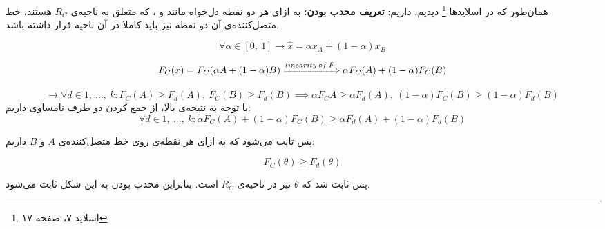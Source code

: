 
همان‌طور که در اسلاید‌ها
\footnote{اسلاید ۷، صفحه ۱۷}
دیدیم، داریم:
\newline
\newline
\textbf{تعریف محدب بودن:}
به ازای هر دو نقطه دل‌خواه مانند  و ، که متعلق به ناحیه‌ی $R_C$ هستند، خط متصل‌کننده‌ی آن دو نقطه نیز باید کاملا در آن ناحیه قرار داشته باشد.



$$
\forall \alpha \in [0, \: 1] \rightarrow
\hat{x} = \alpha x_A + (1 - \alpha) x_B
$$

$$
F_C(x) = F_C(\alpha A + (1 - \alpha) B) \xRightarrow{linearity \: of \: F} \alpha F_C(A) + (1 - \alpha) F_C(B)
$$

$$
\rightarrow \forall d \in {1, \: ..., \: k}: F_C(A) \geq F_d(A), \: F_C(B) \geq F_d(B) \implies \alpha F_C{A} \geq \alpha F_d(A), \: (1 - \alpha) F_C(B) \geq (1 - \alpha) F_d(B)
$$
با توجه به نتیجه‌ی بالا، از جمع کردن دو طرف نامساوی داریم:
$$
\forall d \in {1, \: ..., \: k}: \alpha F_C(A) + (1 - \alpha) F_C(B) \geq \alpha F_d(A) + (1 - \alpha)F_d(B)
$$

پس ثایت می‌شود که به ازای هر نقطه‌ی روی خط متصل‌کننده‌ی $A$ و $B$ داریم:

$$
F_C(\theta) \geq F_d(\theta)
$$

پس ثابت شد که $\theta$ نیز در ناحیه‌ی $R_C$ است. بنابراین محدب بودن به این شکل ثابت می‌شود.